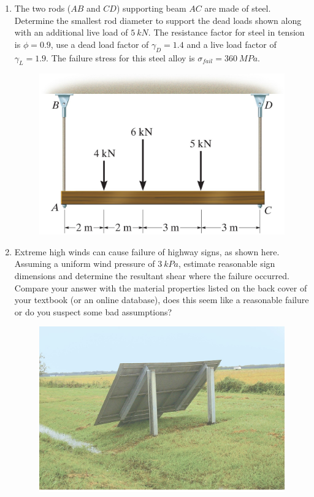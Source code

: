 \documentclass[12pt, oneside]{article}
\begin{document}
\begin{enumerate}
	\item %
		The two rods ($AB$ and $CD$) supporting beam $AC$ are made of steel.
		Determine the smallest rod diameter to support the dead loads shown along with an additional live load of $\SI{5}{kN}$.
		The resistance factor for steel in tension is $\phi=0.9$, use a dead load factor of $\gamma_D = 1.4$ and a live load factor of $\gamma_L = 1.9$.
		The failure stress for this steel alloy is $\sigma_{fail} = \SI{360}{MPa}$.
		\begin{figure}[H]
			\centering
			\includegraphics[width=0.6\linewidth]{hangingbeam}
			\label{fig:hangingbeam}
		\end{figure}

	\item %
		Extreme high winds can cause failure of highway signs, as shown here.
		Assuming a uniform wind pressure of $\SI{3}{kPa}$, estimate reasonable sign dimensions and determine the resultant shear where the failure occurred.
		Compare your answer with the material properties listed on the back cover of your textbook (or an online database), does this seem like a reasonable failure or do you suspect some bad assumptions?
		\begin{figure}[H]
			\centering
			\includegraphics[width=0.6\linewidth]{sign}
			\label{fig:sign}
		\end{figure}
		\pagebreak


\end{enumerate}
\end{document}
